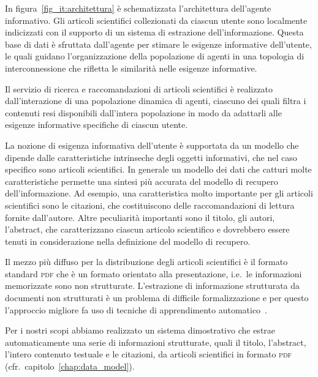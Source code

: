 In figura~\ref{fig_it:architettura} è schematizzata l'architettura dell'agente informativo. Gli articoli scientifici collezionati da ciascun utente sono localmente indicizzati con il supporto di un sistema di estrazione dell'informazione. Questa base di dati è sfruttata dall'agente per stimare le esigenze informative dell'utente, le quali guidano l'organizzazione della popolazione di agenti in una topologia di interconnessione che rifletta le similarità nelle esigenze informative.

Il servizio di ricerca e raccomandazioni di articoli scientifici è realizzato dall'interazione di una popolazione dinamica di agenti, ciascuno dei quali filtra i contenuti resi disponibili dall'intera popolazione in modo da adattarli alle esigenze informative specifiche di ciascun utente.


La nozione di esigenza informativa dell'utente è supportata da un modello che dipende dalle caratteristiche intrinseche degli oggetti informativi, che nel caso specifico sono articoli scientifici. In generale un modello dei dati che catturi molte caratteristiche permette una sintesi più accurata del modello di recupero dell'informazione. Ad esempio, una caratteristica molto importante per gli articoli scientifici sono le citazioni, che costituiscono delle raccomandazioni di lettura fornite dall'autore. Altre peculiarità importanti sono il titolo, gli autori, l'abstract, che caratterizzano ciascun articolo scientifico e dovrebbero essere tenuti in considerazione nella definizione del modello di recupero.

Il mezzo più diffuso per la distribuzione degli articoli scientifici è il formato standard \textsc{pdf} che è un formato orientato alla presentazione, i.e.\ le informazioni memorizzate sono non strutturate. L'estrazione di informazione strutturata da documenti non strutturati è un problema di difficile formalizzazione e per questo l'approccio migliore fa uso di tecniche di apprendimento automatico~\cite{chakrabarti2003mwd, manning2008iir}.

Per i nostri scopi abbiamo realizzato un sistema dimostrativo che estrae automaticamente una serie di informazioni strutturate, quali il titolo, l'abstract, l'intero contenuto testuale e le citazioni, da articoli scientifici in formato \textsc{pdf} (cfr.\ capitolo~\ref{chap:data_model}).

